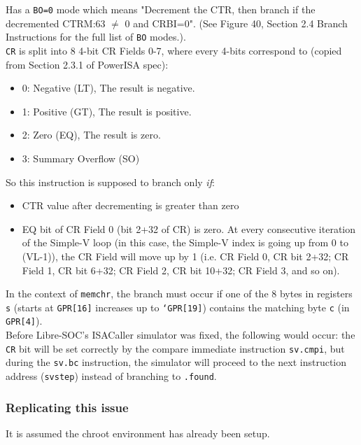 Has a \texttt{BO=0} mode which means "Decrement the CTR, then branch
if the decremented CTRM:63 $\neq$ 0 and CRBI=0". (See Figure 40, Section 2.4
Branch Instructions for the full list of \texttt{BO} modes.).\\

\texttt{CR} is split into 8 4-bit CR Fields 0-7, where every 4-bits correspond
to (copied from Section 2.3.1 of PowerISA spec):

\begin{itemize}
  \item 0: Negative (LT), The result is negative.
  \item 1: Positive (GT), The result is positive.
  \item 2: Zero (EQ), The result is zero.
  \item 3: Summary Overflow (SO)
\end{itemize}

So this instruction is supposed to branch only \textit{if}:

\begin{itemize}
  \item CTR value after decrementing is greater than zero
  \item EQ bit of CR Field 0 (bit 2+32 of CR) is zero.
At every consecutive iteration of the Simple-V loop (in this case,
the Simple-V index is going up from 0 to (VL-1)), the CR Field will move up
by 1 (i.e. CR Field 0, CR bit 2+32; CR Field 1, CR bit 6+32;
CR Field 2, CR bit 10+32; CR Field 3, and so on).
\end{itemize}

In the context of \texttt{memchr}, the branch must occur if one of the 8 bytes
in registers \texttt{s} (starts at \texttt{GPR[16]} increases up to
\texttt{`GPR[19]}) contains the matching byte \texttt{c}
(in \texttt{GPR[4]}).\\

Before Libre-SOC's ISACaller simulator was fixed, the following would occur:
the \texttt{CR} bit will be set correctly by the compare immediate instruction
\texttt{sv.cmpi}, but during the \texttt{sv.bc} instruction, the simulator
will proceed to the next instruction address (\texttt{svstep})
instead of branching to \texttt{.found}.

\subsubsection{Replicating this issue}

It is assumed the chroot environment has already been setup.

